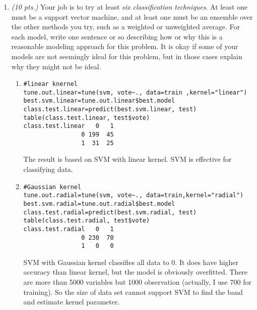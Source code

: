 \documentclass[11pt,english]{article}
\begin{document}
\begin{enumerate}
\item \textit{(10 pts.)} Your job is to try at least \textit{six classification techniques}. At least one must be a support vector machine, and at least one must be an ensemble over the other methods you try, such as a weighted or unweighted average.  For each model, write one sentence or so describing how or why this is a reasonable modeling approach for this problem. It is okay if some of your models are not seemingly ideal for this problem, but in those cases explain why they might not be ideal.
\begin{enumerate}
  \item
\begin{verbatim}
#linear knernel
tune.out.linear=tune(svm, vote~., data=train ,kernel="linear")
best.svm.linear=tune.out.linear$best.model
class.test.linear=predict(best.svm.linear, test)
table(class.test.linear, test$vote)
class.test.linear   0   1
                0 199  45
                1  31  25
\end{verbatim}
The result is based on SVM with linear kernel.  SVM is effective for  classifying data.
  \item
\begin{verbatim}
#Gaussian kernel
tune.out.radial=tune(svm, vote~., data=train,kernel="radial")
best.svm.radial=tune.out.radial$best.model
class.test.radial=predict(best.svm.radial, test)
table(class.test.radial, test$vote)
class.test.radial   0   1
                0 230  70
                1   0   0
\end{verbatim}
SVM with Gaussian kernel classifies all data to 0.  It does have higher accuracy than linear kernel, but the model is obviously overfitted.  There are more than 5000 variables but 1000 observation (actually, I use 700 for training).  So the size of data set cannot support SVM to find the band and estimate kernel parameter.


\end{enumerate}
\end{enumerate}
\end{document}
